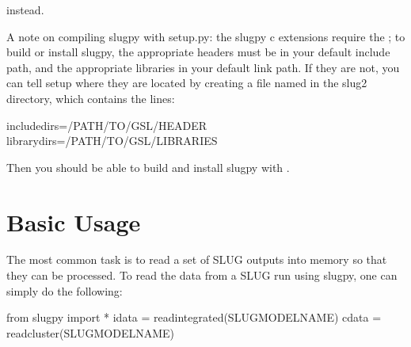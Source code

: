 \documentclass[letterpaper,10pt,english]{sphinxmanual}
\begin{document}
instead.

A note on compiling slugpy with setup.py: the slugpy c extensions require the ; to build or install slugpy, the appropriate headers must be in your default include path, and the appropriate libraries in your default link path. If they are not, you can tell setup where they are located by creating a file named  in the slug2 directory, which contains the lines:

\begin{sphinxVerbatim}
include\PYGZus{}dirs=/PATH/TO/GSL/HEADER
library\PYGZus{}dirs=/PATH/TO/GSL/LIBRARIES
\end{sphinxVerbatim}

Then you should be able to build and install slugpy with .


\section{Basic Usage}
\label{\detokenize{slugpy:basic-usage}}
The most common task is to read a set of SLUG outputs into memory so that they can be processed. To read the data from a SLUG run using slugpy, one can simply do the following:

\begin{sphinxVerbatim}[commandchars=\\\{\}]
from slugpy import *
idata = read\PYGZus{}integrated(\PYGZsq{}SLUG\PYGZus{}MODEL\PYGZus{}NAME\PYGZsq{})
cdata = read\PYGZus{}cluster(\PYGZsq{}SLUG\PYGZus{}MODEL\PYGZus{}NAME\PYGZsq{})
\end{sphinxVerbatim}
\end{document}
